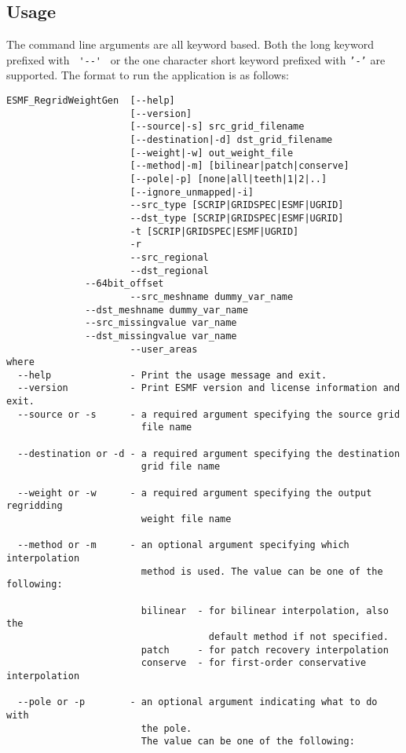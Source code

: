 \subsection{Usage}

The command line arguments are all keyword based.  Both the long keyword prefixed with \verb+ '--' + or the 
one character short keyword prefixed with {\tt '-'} are supported.  The format to run the application is 
as follows:

\begin{verbatim}
ESMF_RegridWeightGen  [--help]
                      [--version]
                      [--source|-s] src_grid_filename 
                      [--destination|-d] dst_grid_filename 
                      [--weight|-w] out_weight_file 
                      [--method|-m] [bilinear|patch|conserve] 
                      [--pole|-p] [none|all|teeth|1|2|..] 
                      [--ignore_unmapped|-i]
                      --src_type [SCRIP|GRIDSPEC|ESMF|UGRID] 
                      --dst_type [SCRIP|GRIDSPEC|ESMF|UGRID]
                      -t [SCRIP|GRIDSPEC|ESMF|UGRID]
                      -r
                      --src_regional
                      --dst_regional
		      --64bit_offset
                      --src_meshname dummy_var_name
		      --dst_meshname dummy_var_name
		      --src_missingvalue var_name
		      --dst_missingvalue var_name
                      --user_areas
where
  --help              - Print the usage message and exit.
  --version           - Print ESMF version and license information and exit.
  --source or -s      - a required argument specifying the source grid 
                        file name

  --destination or -d - a required argument specifying the destination 
                        grid file name

  --weight or -w      - a required argument specifying the output regridding 
                        weight file name

  --method or -m      - an optional argument specifying which interpolation 
                        method is used. The value can be one of the following:

                        bilinear  - for bilinear interpolation, also the 
                                    default method if not specified.
                        patch     - for patch recovery interpolation
                        conserve  - for first-order conservative interpolation

  --pole or -p        - an optional argument indicating what to do with 
                        the pole.  
                        The value can be one of the following:


\end{verbatim}
